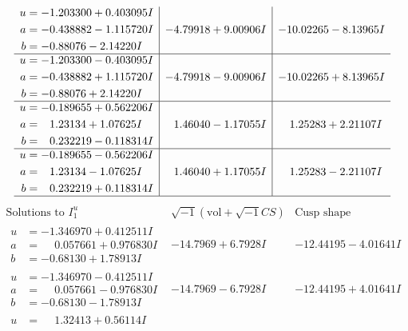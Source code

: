 \documentclass[1p]{elsarticle_modified}
\theoremstyle{definition}
\newcommand{\I}{\sqrt{-1}}
\begin{document}
$$\begin{array}{c|c|c}
\begin{aligned}
u &= -1.203300 + 0.403095 I \\
a &= -0.438882 - 1.115720 I \\
b &= -0.88076 - 2.14220 I\end{aligned}
 & -4.79918 + 9.00906 I & -10.02265 - 8.13965 I \\ \hline\begin{aligned}
u &= -1.203300 - 0.403095 I \\
a &= -0.438882 + 1.115720 I \\
b &= -0.88076 + 2.14220 I\end{aligned}
 & -4.79918 - 9.00906 I & -10.02265 + 8.13965 I \\ \hline\begin{aligned}
u &= -0.189655 + 0.562206 I \\
a &= \phantom{-}1.23134 + 1.07625 I \\
b &= \phantom{-}0.232219 - 0.118314 I\end{aligned}
 & \phantom{-}1.46040 - 1.17055 I & \phantom{-}1.25283 + 2.21107 I \\ \hline\begin{aligned}
u &= -0.189655 - 0.562206 I \\
a &= \phantom{-}1.23134 - 1.07625 I \\
b &= \phantom{-}0.232219 + 0.118314 I\end{aligned}
 & \phantom{-}1.46040 + 1.17055 I & \phantom{-}1.25283 - 2.21107 I\\
 \hline 
 \end{array}$$\newpage$$\begin{array}{c|c|c}  
\text{Solutions to }I^u_{1}& \I (\text{vol} + \sqrt{-1}CS) & \text{Cusp shape}\\
 \hline 
\begin{aligned}
u &= -1.346970 + 0.412511 I \\
a &= \phantom{-}0.057661 + 0.976830 I \\
b &= -0.68130 + 1.78913 I\end{aligned}
 & -14.7969 + 6.7928 I & -12.44195 - 4.01641 I \\ \hline\begin{aligned}
u &= -1.346970 - 0.412511 I \\
a &= \phantom{-}0.057661 - 0.976830 I \\
b &= -0.68130 - 1.78913 I\end{aligned}
 & -14.7969 - 6.7928 I & -12.44195 + 4.01641 I \\ \hline\begin{aligned}
u &= \phantom{-}1.32413 + 0.56114 I \\

\end{aligned}
\end{array}$$
\end{document}
